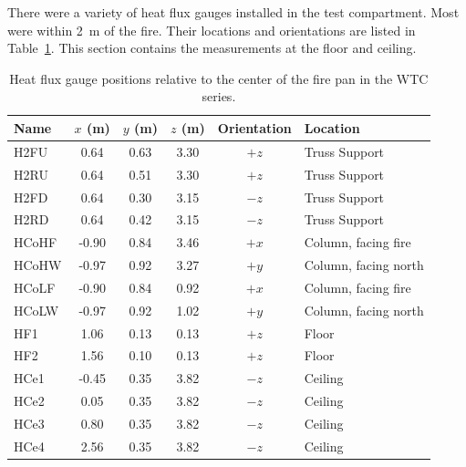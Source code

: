 There were a variety of heat flux gauges installed in the test compartment. Most were within 2~m of the fire. Their locations and orientations are listed in Table~\ref{WTC_Gauges}. This section contains the measurements at the floor and ceiling.

\begin{table}[!h]
\caption[Heat flux gauge positions relative to the center of the fire pan in the WTC series]
{Heat flux gauge positions relative to the center of the fire pan in the WTC series.}
\begin{center}
\begin{tabular}{|l|c|c|c|c|l|}
\hline
Name    & $x$ (m)   & $y$ (m) & $z$ (m)   & Orientation  & Location              \\ \hline \hline
H2FU    & 0.64      & 0.63    & 3.30      &     $+z$     & Truss Support         \\ \hline
H2RU    & 0.64      & 0.51    & 3.30      &     $+z$     & Truss Support         \\ \hline
H2FD    & 0.64      & 0.30    & 3.15      &     $-z$     & Truss Support         \\ \hline
H2RD    & 0.64      & 0.42    & 3.15      &     $-z$     & Truss Support         \\ \hline
HCoHF   & -0.90     & 0.84    & 3.46      &     $+x$     & Column, facing fire   \\ \hline
HCoHW   & -0.97     & 0.92    & 3.27      &     $+y$     & Column, facing north  \\ \hline
HCoLF   & -0.90     & 0.84    & 0.92      &     $+x$     & Column, facing fire   \\ \hline
HCoLW   & -0.97     & 0.92    & 1.02      &     $+y$     & Column, facing north  \\ \hline
HF1     & 1.06      & 0.13    & 0.13      &     $+z$     & Floor                 \\ \hline
HF2     & 1.56      & 0.10    & 0.13      &     $+z$     & Floor                 \\ \hline
HCe1    & -0.45     & 0.35    & 3.82      &     $-z$     & Ceiling               \\ \hline
HCe2    &  0.05     & 0.35    & 3.82      &     $-z$     & Ceiling               \\ \hline
HCe3    &  0.80     & 0.35    & 3.82      &     $-z$     & Ceiling               \\ \hline
HCe4    &  2.56     & 0.35    & 3.82      &     $-z$     & Ceiling               \\ \hline
\end{tabular}
\end{center}
\label{WTC_Gauges}
\end{table}

